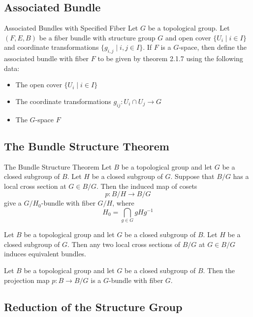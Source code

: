 \documentclass[a4paper]{article}
\begin{document}
\subsection{Associated Bundle}
\begin{defn}{Associated Bundles with Specified Fiber}{} Let $G$ be a topological group. Let $(F,E,B)$ be a fiber bundle with structure group $G$ and open cover $\{U_i\;|\;i\in I\}$ and coordinate transformations $\{g_{i,j}\;|\;i,j\in I\}$. If $F$ is a $G$-space, then define the associated bundle with fiber $F$ to be given by theorem 2.1.7 using the following data: 
\begin{itemize}
\item The open cover $\{U_i\;|\;i\in I\}$
\item The coordinate transformations $g_{ij}:U_i\cap U_j\to G$
\item The $G$-space $F$
\end{itemize}
\end{defn}

\subsection{The Bundle Structure Theorem}
\begin{thm}{The Bundle Structure Theorem}{} Let $B$ be a topological group and let $G$ be a closed subgroup of $B$. Let $H$ be a closed subgroup of $G$. Suppose that $B/G$ has a local cross section at $G\in B/G$. Then the induced map of cosets $$p:B/H\to B/G$$ give a $G/H_0$-bundle with fiber $G/H$, where $$H_0=\bigcap_{g\in G}gHg^{-1}$$
\end{thm}

\begin{thm}{}{} Let $B$ be a topological group and let $G$ be a closed subgroup of $B$. Let $H$ be a closed subgroup of $G$. Then any two local cross sections of $B/G$ at $G\in B/G$ induces equivalent bundles. 
\end{thm}

\begin{crl}{}{} Let $B$ be a topological group and let $G$ be a closed subgroup of $B$. Then the projection map $p:B\to B/G$ is a $G$-bundle with fiber $G$. 
\end{crl}

\subsection{Reduction of the Structure Group}
\end{document}
